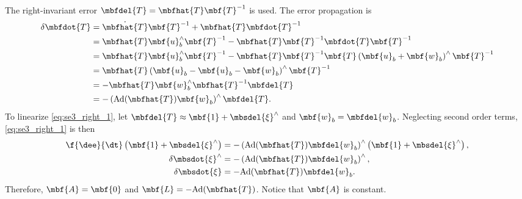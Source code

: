 The right-invariant error  $\mbfdel{T} = \mbfhat{T}\mbf{T}^{-1}$ is used. The error propagation is
\begin{align} 
	\delta \mbfdot{T} & = \dot{\mbfhat{T}}\mbf{T}^{-1}  + \mbfhat{T}\mbfdot{T}^{-1} \nonumber \\
	& = \mbfhat{T} \mbf{u}_b^\wedge\mbf{T}^{-1}   - \mbfhat{T}\mbf{T}^{-1} \mbfdot{T} \mbf{T}^{-1} \nonumber \\
	& = \mbfhat{T} \mbf{u}_b^\wedge\mbf{T}^{-1}  - \mbfhat{T}\mbf{T}^{-1}\mbf{T}\left(\mbf{u}_b + \mbf{w}_b\right)^\wedge \mbf{T}^{-1}  \nonumber \\
	& = \mbfhat{T} \left(\mbf{u}_b - \mbf{u}_b - \mbf{w}_b\right)^\wedge \mbf{T}^{-1}  \nonumber \\
	& = -\mbfhat{T}\mbf{w}_b^\wedge\mbfhat{T}^{-1}\mbfdel{T}  \nonumber \\
	& = -\left(\textrm{Ad}(\mbfhat{T})\mbf{w}_b\right)^\wedge\mbfdel{T}  \label{eq:se3_right_1}.
\end{align}
To linearize \eqref{eq:se3_right_1}, let $\mbfdel{T} \approx \mbf{1} + \mbsdel{\xi}^\wedge$  and $\mbf{w}_b = \mbfdel{w}_b$. Neglecting second order terms, \eqref{eq:se3_right_1} is then 
\begin{align} 
	\f{\dee}{\dt} \left(\mbf{1} + \mbsdel{\xi}^\wedge\right) & = -\left(\textrm{Ad}(\mbfhat{T})\mbfdel{w}_b\right)^\wedge\left(\mbf{1} +\mbsdel{\xi}^\wedge\right), \nonumber \\
	\delta \mbsdot{\xi}^\wedge & = -\left(\textrm{Ad}(\mbfhat{T})\mbfdel{w}_b\right)^\wedge, \nonumber \\
	\delta \mbsdot{\xi} & = -\textrm{Ad}(\mbfhat{T})\mbfdel{w}_b.  \label{eq:se3_right_2}
\end{align}
Therefore, $\mbf{A} = \mbf{0}$ and $\mbf{L} =  -\textrm{Ad}(\mbfhat{T})$. Notice that $\mbf{A}$ is constant.		

